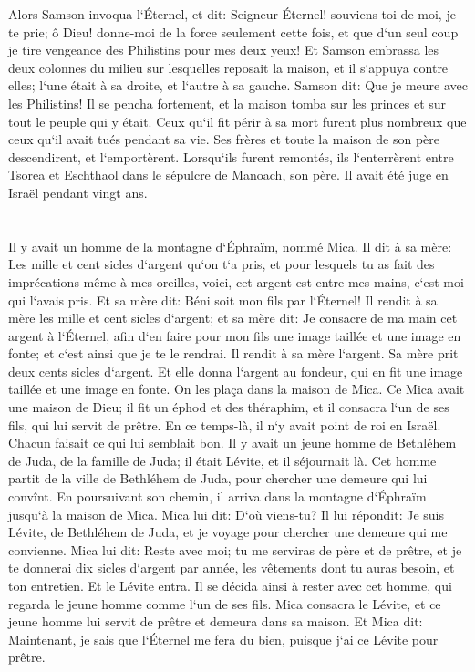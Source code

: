\verse Alors Samson invoqua l`Éternel, et dit: Seigneur Éternel! souviens-toi de moi, je te prie; ô Dieu! donne-moi de la force seulement cette fois, et que d`un seul coup je tire vengeance des Philistins pour mes deux yeux! 
\verse Et Samson embrassa les deux colonnes du milieu sur lesquelles reposait la maison, et il s`appuya contre elles; l`une était à sa droite, et l`autre à sa gauche. 
\verse Samson dit: Que je meure avec les Philistins! Il se pencha fortement, et la maison tomba sur les princes et sur tout le peuple qui y était. Ceux qu`il fit périr à sa mort furent plus nombreux que ceux qu`il avait tués pendant sa vie. 
\verse Ses frères et toute la maison de son père descendirent, et l`emportèrent. Lorsqu`ils furent remontés, ils l`enterrèrent entre Tsorea et Eschthaol dans le sépulcre de Manoach, son père. Il avait été juge en Israël pendant vingt ans. 

\chapter{}

\verse Il y avait un homme de la montagne d`Éphraïm, nommé Mica. 
\verse Il dit à sa mère: Les mille et cent sicles d`argent qu`on t`a pris, et pour lesquels tu as fait des imprécations même à mes oreilles, voici, cet argent est entre mes mains, c`est moi qui l`avais pris. Et sa mère dit: Béni soit mon fils par l`Éternel! 
\verse Il rendit à sa mère les mille et cent sicles d`argent; et sa mère dit: Je consacre de ma main cet argent à l`Éternel, afin d`en faire pour mon fils une image taillée et une image en fonte; et c`est ainsi que je te le rendrai. 
\verse Il rendit à sa mère l`argent. Sa mère prit deux cents sicles d`argent. Et elle donna l`argent au fondeur, qui en fit une image taillée et une image en fonte. On les plaça dans la maison de Mica. 
\verse Ce Mica avait une maison de Dieu; il fit un éphod et des théraphim, et il consacra l`un de ses fils, qui lui servit de prêtre. 
\verse En ce temps-là, il n`y avait point de roi en Israël. Chacun faisait ce qui lui semblait bon. 
\verse Il y avait un jeune homme de Bethléhem de Juda, de la famille de Juda; il était Lévite, et il séjournait là. 
\verse Cet homme partit de la ville de Bethléhem de Juda, pour chercher une demeure qui lui convînt. En poursuivant son chemin, il arriva dans la montagne d`Éphraïm jusqu`à la maison de Mica. 
\verse Mica lui dit: D`où viens-tu? Il lui répondit: Je suis Lévite, de Bethléhem de Juda, et je voyage pour chercher une demeure qui me convienne. 
\verse Mica lui dit: Reste avec moi; tu me serviras de père et de prêtre, et je te donnerai dix sicles d`argent par année, les vêtements dont tu auras besoin, et ton entretien. Et le Lévite entra. 
\verse Il se décida ainsi à rester avec cet homme, qui regarda le jeune homme comme l`un de ses fils. 
\verse Mica consacra le Lévite, et ce jeune homme lui servit de prêtre et demeura dans sa maison. 
\verse Et Mica dit: Maintenant, je sais que l`Éternel me fera du bien, puisque j`ai ce Lévite pour prêtre. 


